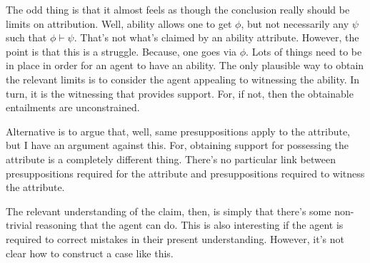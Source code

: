 \documentclass[10pt]{article}
\begin{document}
The odd thing is that it almost feels as though the conclusion really should be limits on attribution.
Well, ability allows one to get \(\phi\), but not necessarily any \(\psi\) such that \(\phi \vdash \psi\).
That's not what's claimed by an ability attribute.
However, the point is that this is a struggle.
Because, one goes via \(\phi\).
Lots of things need to be in place in order for an agent to have an ability.
The only plausible way to obtain the relevant limits is to consider the agent appealing to witnessing the ability.
In turn, it is the witnessing that provides support.
For, if not, then the obtainable entailments are unconstrained.

Alternative is to argue that, well, same presuppositions apply to the attribute, but I have an argument against this.
For, obtaining support for possessing the attribute is a completely different thing.
There's no particular link between presuppositions required for the attribute and presuppositions required to witness the attribute.

The relevant understanding of the claim, then, is simply that there's some non-trivial reasoning that the agent can do.
This is also interesting if the agent is required to correct mistakes in their present understanding.
However, it's not clear how to construct a case like this.
\end{document}
